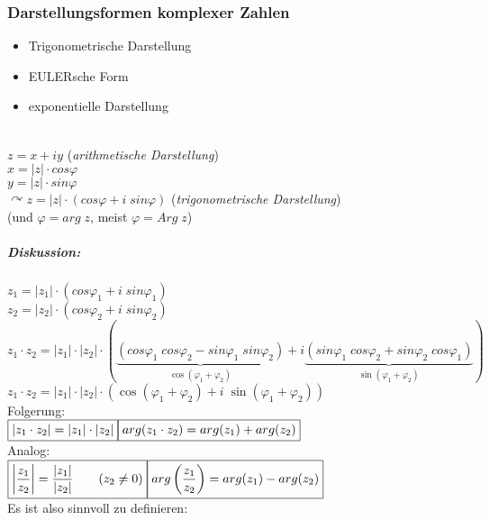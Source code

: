 \subsubsection{Darstellungsformen komplexer Zahlen}
\begin{itemize}
\item Trigonometrische Darstellung
\item EULERsche Form
\item exponentielle Darstellung
\end{itemize}
\\
$\boxed{z=x+iy}$ \qquad (\emph{arithmetische Darstellung})\\
$x=|z|\cdot cos \varphi$\\
$y=|z|\cdot sin \varphi$\\
$\curvearrowright \boxed{z=|z|\cdot (cos\varphi + i\; sin \varphi)}$ \qquad (\emph{trigonometrische Darstellung})\\
(und $\varphi=arg\; z$, meist $\varphi = Arg \; z$)
\subparagraph{Diskussion:} \parskp
$z_1= |z_1|\cdot (cos \varphi_1 + i \; sin \varphi_1)$\\
$z_2= |z_2|\cdot (cos \varphi_2 + i \; sin \varphi_2)$\medskip\\
$z_1 \cdot z_2 = |z_1| \cdot |z_2| \cdot ( \underbrace{(cos\varphi_1 \; cos \varphi_2 - sin\varphi_1 \; sin \varphi_2)}_{\cos(\varphi_1+\varphi_2)}+i\underbrace{(sin \varphi_1 \; cos \varphi_2 + sin \varphi_2 \; cos \varphi_1)}_{\sin(\varphi_1+\varphi_2)})$\\
$\boxed{z_1 \cdot z_2 = |z_1| \cdot |z_2| \cdot(\cos(\varphi_1+\varphi_2)+i\; \sin(\varphi_1+\varphi_2))}$\\
Folgerung:\\
$\boxed{|z_1\cdot z_2| = |z_1| \cdot |z_2|}\\
\boxed{arg(z_1\cdot z_2)=arg(z_1)+arg(z_2)}$\\
Analog:\\
$\boxed{\left|\frac{z_1}{z_2}\right| = \frac{|z_1|}{|z_2|} \qquad (z_2 \not = 0)} \\
\boxed{arg\left(\frac{z_1}{z_2}\right) = arg(z_1) - arg (z_2)}$\\
Es ist also sinnvoll zu definieren:
